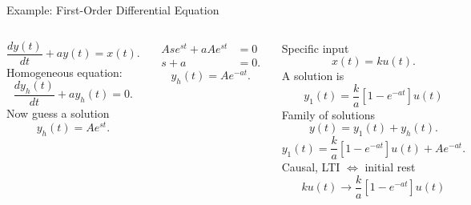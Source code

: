 \begin{frame}[plain]{Example: First-Order Differential Equation}




       \begin{columns}
            \begin{equation*}
                \frac{dy(t)}{dt} + ay(t) = x(t).
            \end{equation*}
            \pause
            Homogeneous equation:
            \begin{equation*}
                \frac{dy_h(t)}{dt} + ay_h(t) = 0.
            \end{equation*}
            Now guess a solution
            \begin{equation*}
                y_h(t) = Ae^{st}.
            \end{equation*}

            {
                \begin{align*}
                    Ase^{st} + aAe^{st} &= 0\\
                    s+a & = 0.
                \end{align*}
                \pause
                \begin{equation*}
                    y_h(t) = Ae^{-at}.
                \end{equation*}

            }
            \pause
            {
                Specific input
                \begin{equation*}
                    x(t) = ku(t).
                \end{equation*}
                A solution is
                \begin{equation*}
                    y_1(t) = \frac{k}{a}\left[1-e^{-at}\right]u(t)
                \end{equation*}
                Family of solutions
                \begin{equation*}
                    y(t) = y_1(t) + y_h(t).
                \end{equation*}
                \begin{equation*}
                    y_1(t) = \frac{k}{a}\left[1-e^{-at}\right]u(t) +  Ae^{-at}.
                \end{equation*}
                Causal, LTI $\Longleftrightarrow$ initial rest
                \begin{equation*}
                    ku(t) \rightarrow \frac{k}{a}\left[1-e^{-at}\right]u(t)
                \end{equation*}

            }
        \end{columns}
\end{frame}


